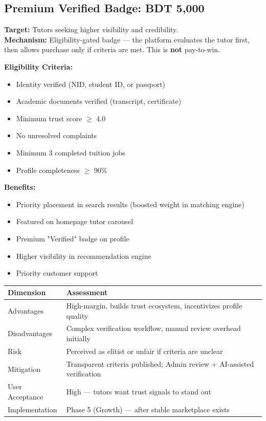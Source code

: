 \documentclass[12pt,a4paper,twoside]{report}
\begin{document}
\subsection{Premium Verified Badge: BDT 5,000}

\textbf{Target:} Tutors seeking higher visibility and credibility. \\
\textbf{Mechanism:} Eligibility-gated badge — the platform evaluates the tutor first, then allows purchase only if criteria are met. This is \textbf{not} pay-to-win.

\textbf{Eligibility Criteria:}
\begin{itemize}
    \item Identity verified (NID, student ID, or passport)
    \item Academic documents verified (transcript, certificate)
    \item Minimum trust score $\geq$ 4.0
    \item No unresolved complaints
    \item Minimum 3 completed tuition jobs
    \item Profile completeness $\geq$ 90\%
\end{itemize}

\textbf{Benefits:}
\begin{itemize}
    \item Priority placement in search results (boosted weight in matching engine)
    \item Featured on homepage tutor carousel
    \item Premium "Verified" badge on profile
    \item Higher visibility in recommendation engine
    \item Priority customer support
\end{itemize}

\begin{longtable}{p{4cm}|p{9cm}}
\toprule
\textbf{Dimension} & \textbf{Assessment} \\
\midrule
\endhead
\bottomrule
\endfoot
Advantages       & High-margin, builds trust ecosystem, incentivizes profile quality \\
Disadvantages    & Complex verification workflow, manual review overhead initially \\
Risk             & Perceived as elitist or unfair if criteria are unclear \\
Mitigation       & Transparent criteria published; Admin review + AI-assisted verification \\
User Acceptance  & High — tutors want trust signals to stand out \\
Implementation   & Phase 5 (Growth) — after stable marketplace exists \\
\bottomrule
\end{longtable}
\end{document}
